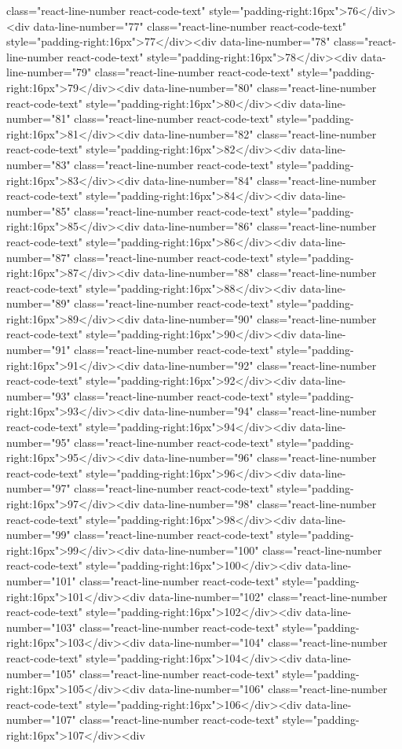 {{{{{{{class="react-line-number react-code-text" style="padding-right:16px">76</div><div data-line-number="77" class="react-line-number react-code-text" style="padding-right:16px">77</div><div data-line-number="78" class="react-line-number react-code-text" style="padding-right:16px">78</div><div data-line-number="79" class="react-line-number react-code-text" style="padding-right:16px">79</div><div data-line-number="80" class="react-line-number react-code-text" style="padding-right:16px">80</div><div data-line-number="81" class="react-line-number react-code-text" style="padding-right:16px">81</div><div data-line-number="82" class="react-line-number react-code-text" style="padding-right:16px">82</div><div data-line-number="83" class="react-line-number react-code-text" style="padding-right:16px">83</div><div data-line-number="84" class="react-line-number react-code-text" style="padding-right:16px">84</div><div data-line-number="85" class="react-line-number react-code-text" style="padding-right:16px">85</div><div data-line-number="86" class="react-line-number react-code-text" style="padding-right:16px">86</div><div data-line-number="87" class="react-line-number react-code-text" style="padding-right:16px">87</div><div data-line-number="88" class="react-line-number react-code-text" style="padding-right:16px">88</div><div data-line-number="89" class="react-line-number react-code-text" style="padding-right:16px">89</div><div data-line-number="90" class="react-line-number react-code-text" style="padding-right:16px">90</div><div data-line-number="91" class="react-line-number react-code-text" style="padding-right:16px">91</div><div data-line-number="92" class="react-line-number react-code-text" style="padding-right:16px">92</div><div data-line-number="93" class="react-line-number react-code-text" style="padding-right:16px">93</div><div data-line-number="94" class="react-line-number react-code-text" style="padding-right:16px">94</div><div data-line-number="95" class="react-line-number react-code-text" style="padding-right:16px">95</div><div data-line-number="96" class="react-line-number react-code-text" style="padding-right:16px">96</div><div data-line-number="97" class="react-line-number react-code-text" style="padding-right:16px">97</div><div data-line-number="98" class="react-line-number react-code-text" style="padding-right:16px">98</div><div data-line-number="99" class="react-line-number react-code-text" style="padding-right:16px">99</div><div data-line-number="100" class="react-line-number react-code-text" style="padding-right:16px">100</div><div data-line-number="101" class="react-line-number react-code-text" style="padding-right:16px">101</div><div data-line-number="102" class="react-line-number react-code-text" style="padding-right:16px">102</div><div data-line-number="103" class="react-line-number react-code-text" style="padding-right:16px">103</div><div data-line-number="104" class="react-line-number react-code-text" style="padding-right:16px">104</div><div data-line-number="105" class="react-line-number react-code-text" style="padding-right:16px">105</div><div data-line-number="106" class="react-line-number react-code-text" style="padding-right:16px">106</div><div data-line-number="107" class="react-line-number react-code-text" style="padding-right:16px">107</div><div }}}}}}}
